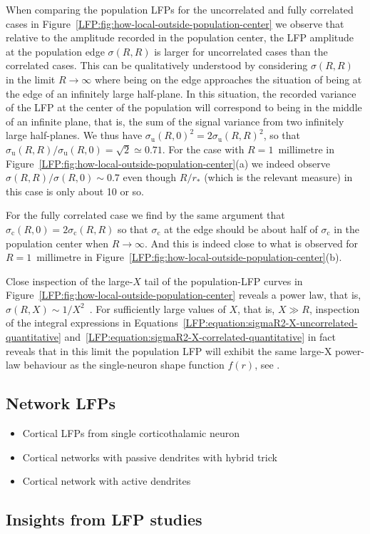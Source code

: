 When comparing the population LFPs for the uncorrelated and fully correlated cases in
Figure~\ref{LFP:fig:how-local-outside-population-center} we observe that 
relative to the amplitude recorded in the population center, the LFP amplitude at the 
population edge $\sigma(R,R)$ is larger for uncorrelated cases than the correlated cases.
This can be qualitatively understood by considering $\sigma(R,R)$ in the limit $R \rightarrow \infty$ where
being on the edge approaches the situation of being at the edge of an infinitely large half-plane. In this
situation, the recorded variance of the LFP at the center of the population will correspond to being in the middle
of an infinite plane, that is, the sum of the signal variance from two infinitely large half-planes. We thus have
$\sigma_\text{u}(R,0)^2=2\sigma_\text{u}(R,R)^2$, so that  $\sigma_\text{u}(R,R)/\sigma_\text{u}(R,0)=\sqrt{2} \simeq 0.71$. For the case with
$R=1$~millimetre in Figure~\ref{LFP:fig:how-local-outside-population-center}(a) we indeed observe 
$\sigma(R,R)/\sigma(R,0) \sim 0.7$ even though $R/r_*$ (which is the relevant measure) in this case
is only about 10 or so.

For the fully correlated case we find by the same argument that  $\sigma_\text{c}(R,0)=2\sigma_\text{c}(R,R)$ so that
$\sigma_\text{c}$ at the edge should be about half of  $\sigma_\text{c}$ in the population center when 
$R \rightarrow \infty$. And this is indeed close to what is observed for $R=1$~millimetre in 
Figure~\ref{LFP:fig:how-local-outside-population-center}(b). 

Close inspection of the large-$X$ tail of the population-LFP curves in Figure~\ref{LFP:fig:how-local-outside-population-center}
reveals a power law, that is, $\sigma(R,X) \sim 1/X^2$~\citep[Figure~3.9]{Einevoll2013a}. For sufficiently large values of $X$, that is,
$X \gg R$, inspection of the integral expressions in Equations~\ref{LFP:equation:sigmaR2-X-uncorrelated-quantitative}  
and~\ref{LFP:equation:sigmaR2-X-correlated-quantitative} in fact reveals that in this limit the population LFP will exhibit the 
same large-X power-law behaviour as the single-neuron shape function $f(r)$, see \citep{Einevoll2013a}.      


\subsection{Network LFPs}
\begin{itemize}
\item Cortical LFPs from single corticothalamic neuron \citep{Hagen2017}
\item Cortical networks with passive dendrites with hybrid trick \citep{Hagen2016}
\item Cortical network with active dendrites \citep{Reimann2013}
\end{itemize}

\subsection{Insights from LFP studies} 
